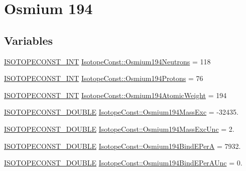 \hypertarget{group___isotope_const-_osmium-_os194}{}\section{Osmium 194}
\label{group___isotope_const-_osmium-_os194}
\subsection*{Variables}
\begin{DoxyCompactItemize}
\item 
\mbox{\hyperlink{group___isotope_const-_macros_ga5f18360b3e99483a35c32d789e62621c}{I\+S\+O\+T\+O\+P\+E\+C\+O\+N\+S\+T\+\_\+\+I\+NT}} \mbox{\hyperlink{group___isotope_const-_osmium-_os194_ga57384d75a717e64e3b362c2e02a4bcb6}{Isotope\+Const\+::\+Osmium194\+Neutrons}} = 118
\item 
\mbox{\hyperlink{group___isotope_const-_macros_ga5f18360b3e99483a35c32d789e62621c}{I\+S\+O\+T\+O\+P\+E\+C\+O\+N\+S\+T\+\_\+\+I\+NT}} \mbox{\hyperlink{group___isotope_const-_osmium-_os194_ga0caaaa3f8a9fb83811f8bc88960fba90}{Isotope\+Const\+::\+Osmium194\+Protons}} = 76
\item 
\mbox{\hyperlink{group___isotope_const-_macros_ga5f18360b3e99483a35c32d789e62621c}{I\+S\+O\+T\+O\+P\+E\+C\+O\+N\+S\+T\+\_\+\+I\+NT}} \mbox{\hyperlink{group___isotope_const-_osmium-_os194_gaff353a053203cccb6bde19c5f490c385}{Isotope\+Const\+::\+Osmium194\+Atomic\+Weight}} = 194
\item 
\mbox{\hyperlink{group___isotope_const-_macros_ga8f45a7272ce02c0b4c65c44636ed719a}{I\+S\+O\+T\+O\+P\+E\+C\+O\+N\+S\+T\+\_\+\+D\+O\+U\+B\+LE}} \mbox{\hyperlink{group___isotope_const-_osmium-_os194_ga4675e9243df0b50a59d068d9d8ebce35}{Isotope\+Const\+::\+Osmium194\+Mass\+Exc}} = -\/32435.
\item 
\mbox{\hyperlink{group___isotope_const-_macros_ga8f45a7272ce02c0b4c65c44636ed719a}{I\+S\+O\+T\+O\+P\+E\+C\+O\+N\+S\+T\+\_\+\+D\+O\+U\+B\+LE}} \mbox{\hyperlink{group___isotope_const-_osmium-_os194_ga2c65b91a0e10a3318bb93e3c0d04ef00}{Isotope\+Const\+::\+Osmium194\+Mass\+Exc\+Unc}} = 2.
\item 
\mbox{\hyperlink{group___isotope_const-_macros_ga8f45a7272ce02c0b4c65c44636ed719a}{I\+S\+O\+T\+O\+P\+E\+C\+O\+N\+S\+T\+\_\+\+D\+O\+U\+B\+LE}} \mbox{\hyperlink{group___isotope_const-_osmium-_os194_ga03a6566689f3c521b75f734b874587c9}{Isotope\+Const\+::\+Osmium194\+Bind\+E\+PerA}} = 7932.
\item 
\mbox{\hyperlink{group___isotope_const-_macros_ga8f45a7272ce02c0b4c65c44636ed719a}{I\+S\+O\+T\+O\+P\+E\+C\+O\+N\+S\+T\+\_\+\+D\+O\+U\+B\+LE}} \mbox{\hyperlink{group___isotope_const-_osmium-_os194_ga8572a4405af611c0f868306ed1b05271}{Isotope\+Const\+::\+Osmium194\+Bind\+E\+Per\+A\+Unc}} = 0.

\end{DoxyCompactItemize}
